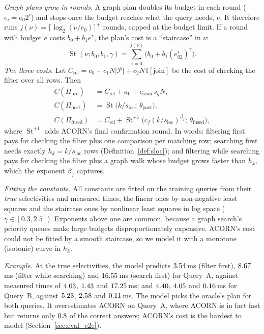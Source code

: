 \documentclass[sigconf, nonacm]{acmart}
\newcommand{\sg}{s_g}
\newcommand{\sloc}{s_{\text{loc}}}
\newcommand{\Ppre}{\Pi_{\text{pre}}}
\newcommand{\Pfus}{\Pi_{\text{fused}}}
\newcommand{\Ppost}{\Pi_{\text{post}}}
\begin{document}
\emph{Graph plans grow in rounds.} A graph plan doubles its budget in each round ($e_i=e_0 2^i$) and stops once the budget reaches what the query needs, $\nu$. It therefore runs $j(\nu)=\lceil\log_2(\nu/e_0)\rceil^+$ rounds, capped at the budget limit. If a round with budget $e$ costs $b_0+b_1e^\gamma$, the plan's cost is a ``staircase'' in $\nu$:
\begin{equation}\label{eq:stair}
\operatorname{St}(\nu;b_0,b_1,\gamma)=\sum_{i=0}^{j(\nu)}\big(b_0+b_1(e_02^i)^\gamma\big).
\end{equation}
\emph{The three costs.} Let $C_{\text{rel}}=c_0+c_1N|\mathcal{P}|+c_2N\,\mathbb{I}[\text{join}]$ be the cost of checking the filter over all rows. Then
\begin{align}
C(\Ppre)&=C_{\text{rel}}+a_0+c_{\text{scan}}\,\sg N,\label{eq:cost_pre}\\
C(\Ppost)&=\operatorname{St}\!\big(k/\sloc;\,\theta_{\text{post}}\big),\label{eq:cost_post}\\
C(\Pfus)&=C_{\text{rel}}+\operatorname{St}^{+1}\!\big(c_f(k/\sloc)^{\beta_f};\,\theta_{\text{fused}}\big),\label{eq:cost_fused}
\end{align}
where $\operatorname{St}^{+1}$ adds ACORN's final confirmation round. In words: filtering first pays for checking the filter plus one comparison per matching row; searching first needs exactly $h_k=k/\sloc$ rows (Definition~\ref{def:sloc}); and filtering while searching pays for checking the filter plus a graph walk whose budget grows faster than $h_k$, which the exponent $\beta_f$ captures.

\emph{Fitting the constants.} All constants are fitted on the training queries from their \emph{true} selectivities and measured times, the linear ones by non-negative least squares and the staircase ones by nonlinear least squares in log space ($\gamma\in[0.3,2.5]$). Exponents above one are common, because a graph search's priority queues make large budgets disproportionately expensive. ACORN's cost could not be fitted by a smooth staircase, so we model it with a monotone (isotonic) curve in $h_k$.

\emph{Example.} At the true selectivities, the model predicts $3.54$\,ms (filter first), $8.67$\,ms (filter while searching) and $16.55$\,ms (search first) for Query~A, against measured times of $4.03$, $1.43$ and $17.25$\,ms; and $4.40$, $4.05$ and $0.16$\,ms for Query~B, against $5.23$, $2.58$ and $0.11$\,ms. The model picks the oracle's plan for both queries. It overestimates ACORN on Query~A, where ACORN is in fact fast but returns only $0.8$ of the correct answers; ACORN's cost is the hardest to model (Section~\ref{sec:eval_e2e}).
\end{document}
